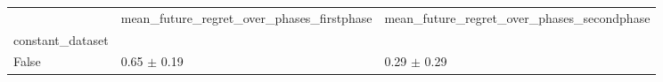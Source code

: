 \begin{tabular}{lll}
\toprule
 & mean_future_regret_over_phases_firstphase & mean_future_regret_over_phases_secondphase \\
constant_dataset &  &  \\
\midrule
False & 0.65 $\pm$ 0.19 & 0.29 $\pm$ 0.29 \\
\bottomrule
\end{tabular}
